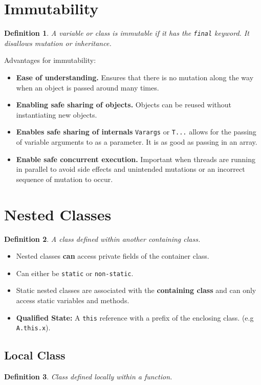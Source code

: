 \documentclass[10pt,landscape,a4paper]{article}
\newtheorem{definition}{Definition}[section]
\begin{document}
\begin{multicols*}{4}
\section{Immutability}
\begin{definition}
    A variable or class is immutable if it has the \texttt{final} keyword. It disallows mutation or inheritance.
\end{definition}
Advantages for immutability:
\begin{itemize}
    \item \textbf{Ease of understanding.}
        \subitem Ensures that there is no mutation along the way when an object is passed around many times.
    \item \textbf{Enabling safe sharing of objects.}
        \subitem Objects can be reused without instantiating new objects.
    \item \textbf{Enables safe sharing of internals}
        \subitem \texttt{Varargs} or \texttt{T...} allows for the passing of variable arguments to as a parameter. It is as good as passing in an array. 
    \item \textbf{Enable safe concurrent execution.}
        \subitem Important when threads are running in parallel to avoid side effects and unintended mutations or an incorrect sequence of mutation to occur.
\end{itemize}
\section{Nested Classes}
\begin{definition}
    A class defined within another containing class.
\end{definition}
\begin{itemize}
    \item Nested classes \textbf{can} access private fields of the container class.
    \item Can either be \texttt{static} or \texttt{non-static}.
    \item Static nested classes are associated with the \textbf{containing class} and can only access static variables and methods.
    \item \textbf{Qualified State:} A \texttt{this} reference with a prefix of the enclosing class. (e.g \texttt{A.this.x}). 
\end{itemize}

\subsection{Local Class}
\begin{definition}
    Class defined locally within a function.
\end{definition}


\end{multicols*}
\end{document}
